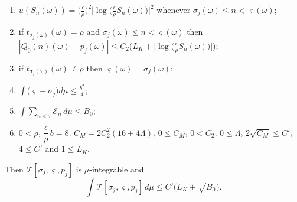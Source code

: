 \begin{lemma}
\begin{enumerate}
$\displaystyle\int\sum_{\sigma_j\le m<\varsigma}u(S_m)\,d\mu\le4\Lambda$;
\item\label{it:mftb-uw} $u(S_n(\omega))
=\bigl(\tfrac{\epsilon}{\rho}\bigr)^2
\bigl|\log\bigl(\tfrac{\epsilon}{\rho}S_n(\omega)\bigr)\bigr|^2$ whenever
$\sigma_j(\omega)\le n<\varsigma(\omega)$;
\item\label{it:mftb-Q} if $t_{\sigma_j(\omega)}(\omega)=\rho$ and
$\sigma_j(\omega)\le n<\varsigma(\omega)$ then
$|Q_0(n)(\omega)-p_j(\omega)|
\le C_2\bigl(L_K+\bigl|\log\bigl(\tfrac{\epsilon}{\rho}S_n(\omega)\bigr)\bigr|\bigr)$;
\item\label{it:mftb-off} if $t_{\sigma_j(\omega)}(\omega)\ne\rho$ then
$\varsigma(\omega)=\sigma_j(\omega)$;
\item\label{it:mftb-time} $\displaystyle
\int\bigl(\varsigma-\sigma_j\bigr)d\mu\le\frac{b^2}{4}$;
\item\label{it:mftb-budget} $\displaystyle
\int\sum_{n<\tau}\mathcal E_n\,d\mu\le B_0$;
\item\label{it:mftb-const} $0<\rho$, $\dfrac{\epsilon}{\rho}\,b=8$,
$C_M=2C_2^2(16+4\Lambda)$, $0\le C_M$, $0<C_2$, $0\le\Lambda$,
$2\sqrt{C_M}\le C'$, $4\le C'$ and $1\le L_K$.
\end{enumerate}
Then $\mathcal T[\sigma_j,\varsigma,p_j]$ is $\mu$-integrable and
\begin{equation}\label{eq:mftb-travel}
  \int\mathcal T[\sigma_j,\varsigma,p_j]\,d\mu
  \le C'\bigl(L_K+\sqrt{B_0}\bigr).
\end{equation}
\end{lemma}
